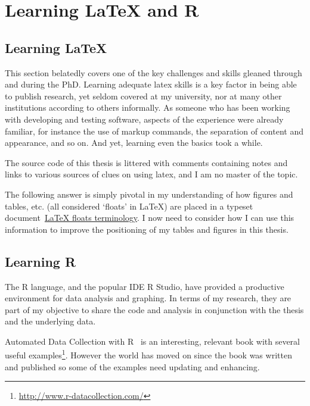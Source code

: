 \chapter{Learning LaTeX and R}


\section{Learning LaTeX}
This section belatedly covers one of the key challenges and skills gleaned through and during the PhD. Learning adequate latex skills is a key factor in being able to publish research, yet seldom covered at my university, nor at many other institutions according to others informally.
As someone who has been working with developing and testing software, aspects of the experience were already familiar, for instance the use of markup commands, the separation of content and appearance, and so on. And yet, learning even the basics took a while. 

The source code of this thesis is littered with comments containing notes and links to various sources of clues on using latex, and I am no master of the topic.

The following answer is simply pivotal in my understanding of how figures and tables, etc. (all considered `floats' in LaTeX) are placed in a typeset document~\href{https://tex.stackexchange.com/questions/39017/how-to-influence-the-position-of-float-environments-like-figure-and-table-in-lat/39020#39020}{LaTeX floats terminology}. I now need to consider how I can use this information to improve the positioning of my tables and figures in this thesis. 



\section{Learning R}

The R language, and the popular IDE R Studio, have provided a productive environment for data analysis and graphing. In terms of my research, they are part of my objective to share the code and analysis in conjunction with the thesis and the underlying data.

Automated Data Collection with R~\cite{munzert2014automated} is an interesting, relevant book with several useful examples\footnote{\url{http://www.r-datacollection.com/}}. However the world has moved on since the book was written and published so some of the examples need updating and enhancing.

